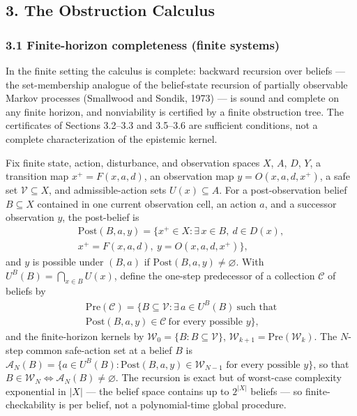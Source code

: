 \documentclass[10pt,twocolumn]{article}
\theoremstyle{definition}
\begin{document}
\subsection{3. The Obstruction Calculus}\label{calc-the-obstruction-calculus}

\subsubsection{3.1 Finite-horizon completeness (finite systems)}\label{calc-finite-horizon-completeness}

In the finite setting the calculus is complete: backward recursion over beliefs --- the set-membership analogue of the belief-state recursion of partially observable Markov processes (Smallwood and Sondik, 1973) --- is sound and complete on any finite horizon, and nonviability is certified by a finite obstruction tree. The certificates of Sections 3.2--3.3 and 3.5--3.6 are sufficient conditions, not a complete characterization of the epistemic kernel.

Fix finite state, action, disturbance, and observation spaces \(X\),
\(A\), \(D\), \(Y\), a transition map \(x^+ = F(x,a,d)\), an observation
map \(y = O(x,a,d,x^+)\), a safe set \(\mathcal V\subseteq X\), and
admissible-action sets \(U(x)\subseteq A\). For a post-observation belief \(B\subseteq X\) contained in one
current observation cell, an action \(a\), and a successor observation
\(y\), the post-belief is
\[
\begin{gathered}
\mathrm{Post}(B,a,y) = \bigl\{ x^+\in X : \exists\, x\in B,\ d\in D(x), \\
x^+ = F(x,a,d),\ y = O(x,a,d,x^+) \bigr\},
\end{gathered}
\]
and \(y\) is possible under \((B,a)\) if \(\mathrm{Post}(B,a,y)\neq\varnothing\).
With \(U^B(B)=\bigcap_{x\in B}U(x)\), define the one-step predecessor of a
collection \(\mathcal C\) of beliefs by
\[
\begin{gathered}
\mathrm{Pre}(\mathcal C) = \bigl\{ B\subseteq\mathcal V : \exists\, a\in U^B(B)\ \text{such that}\\
\mathrm{Post}(B,a,y)\in\mathcal C\ \text{for every possible } y \bigr\},
\end{gathered}
\]
and the finite-horizon kernels by \(\mathcal W_0 = \{B : B\subseteq\mathcal V\}\),
\(\mathcal W_{k+1} = \mathrm{Pre}(\mathcal W_k)\).
The \(N\)-step common safe-action set at a belief \(B\) is
\(\mathcal{A}_N(B) = \bigl\{ a \in U^B(B) : \mathrm{Post}(B,a,y) \in \mathcal W_{N-1} \text{ for every possible } y \bigr\}\),
so that \(B \in \mathcal W_N \iff \mathcal{A}_N(B) \neq \varnothing\). The recursion is exact but of worst-case complexity exponential in
\(|X|\) --- the belief space contains up to \(2^{|X|}\) beliefs --- so
finite-checkability is per belief, not a polynomial-time global procedure.
\end{document}
